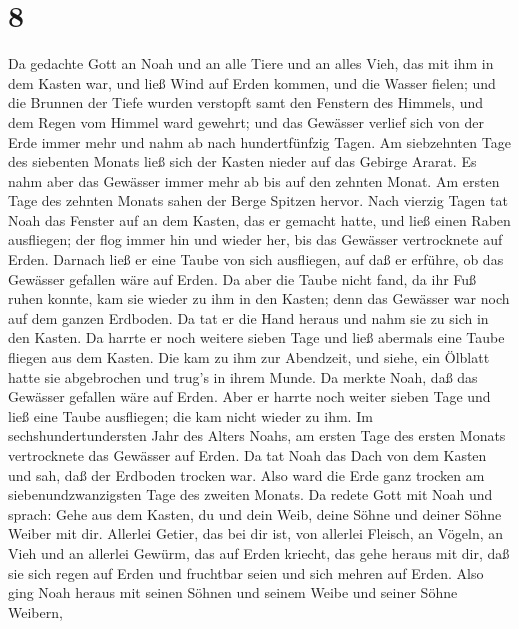 \hypertarget{section-7}{%
\section{8}\label{section-7}}

 Da gedachte Gott an Noah und an alle Tiere und an alles
Vieh, das mit ihm in dem Kasten war, und ließ Wind auf Erden kommen, und
die Wasser fielen;  und die Brunnen der Tiefe wurden
verstopft samt den Fenstern des Himmels, und dem Regen vom Himmel ward
gewehrt;  und das Gewässer verlief sich von der Erde immer
mehr und nahm ab nach hundertfünfzig Tagen.  Am siebzehnten
Tage des siebenten Monats ließ sich der Kasten nieder auf das Gebirge
Ararat.  Es nahm aber das Gewässer immer mehr ab bis auf den
zehnten Monat. Am ersten Tage des zehnten Monats sahen der Berge Spitzen
hervor.  Nach vierzig Tagen tat Noah das Fenster auf an dem
Kasten, das er gemacht hatte,  und ließ einen Raben
ausfliegen; der flog immer hin und wieder her, bis das Gewässer
vertrocknete auf Erden.  Darnach ließ er eine Taube von sich
ausfliegen, auf daß er erführe, ob das Gewässer gefallen wäre auf Erden.
 Da aber die Taube nicht fand, da ihr Fuß ruhen konnte, kam
sie wieder zu ihm in den Kasten; denn das Gewässer war noch auf dem
ganzen Erdboden. Da tat er die Hand heraus und nahm sie zu sich in den
Kasten.  Da harrte er noch weitere sieben Tage und ließ
abermals eine Taube fliegen aus dem Kasten.  Die kam zu ihm
zur Abendzeit, und siehe, ein Ölblatt hatte sie abgebrochen und trug's
in ihrem Munde. Da merkte Noah, daß das Gewässer gefallen wäre auf
Erden.  Aber er harrte noch weiter sieben Tage und ließ
eine Taube ausfliegen; die kam nicht wieder zu ihm.  Im
sechshundertundersten Jahr des Alters Noahs, am ersten Tage des ersten
Monats vertrocknete das Gewässer auf Erden. Da tat Noah das Dach von dem
Kasten und sah, daß der Erdboden trocken war.  Also ward
die Erde ganz trocken am siebenundzwanzigsten Tage des zweiten Monats.
 Da redete Gott mit Noah und sprach:  Gehe aus
dem Kasten, du und dein Weib, deine Söhne und deiner Söhne Weiber mit
dir.  Allerlei Getier, das bei dir ist, von allerlei
Fleisch, an Vögeln, an Vieh und an allerlei Gewürm, das auf Erden
kriecht, das gehe heraus mit dir, daß sie sich regen auf Erden und
fruchtbar seien und sich mehren auf Erden.  Also ging Noah
heraus mit seinen Söhnen und seinem Weibe und seiner Söhne Weibern,
